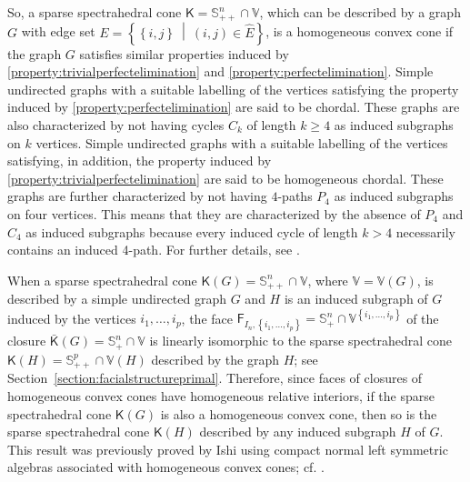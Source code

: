 \documentclass[oneside]{amsart}
\theoremstyle{plain}
\theoremstyle{definition}
\theoremstyle{remark}
\numberwithin{equation}{section}
\begin{document}
So, a sparse spectrahedral cone $\mathsf{K} = \mathbb{S}^{n}_{++} \cap
\mathbb{V}$, which can be described by a graph $G$ with edge set $E =
\left\{\left\{i, j\right\}\ \middle|\ (i, j) \in \hat{E}\right\}$, is a
homogeneous convex cone if the graph $G$ satisfies similar properties
induced by \eqref{property:trivialperfectelimination} and
\eqref{property:perfectelimination}. Simple undirected graphs with a
suitable labelling of the vertices satisfying the property induced by
\eqref{property:perfectelimination} are said to be chordal. These graphs
are also characterized by not having cycles $C_{k}$ of length $k \geq 4$ as
induced subgraphs on $k$ vertices. Simple undirected graphs with a suitable
labelling of the vertices satisfying, in addition, the property induced by
\eqref{property:trivialperfectelimination} are said to be homogeneous
chordal. These graphs are further characterized by not having $4$-paths
$P_{4}$ as induced subgraphs on four vertices. This means that they are
characterized by the absence of $P_{4}$ and $C_{4}$ as induced subgraphs
because every induced cycle of length $k > 4$ necessarily contains an
induced 4-path. For further details, see \cite[\S2 and \S3]{TunVan23}.

When a sparse spectrahedral cone $\mathsf{K}(G) = \mathbb{S}^{n}_{++} \cap
\mathbb{V}$, where $\mathbb{V} = \mathbb{V}(G)$, is described by a simple
undirected graph $G$ and $H$ is an induced subgraph of $G$ induced by the
vertices $i_{1}, \dotsc, i_{p}$, the face $\mathsf{F}_{I_{n},\left\{i_{1},
\dotsc, i_{p}\right\}} = \mathbb{S}^{n}_{+} \cap \mathbb{V}^{\left\{i_{1},
\dotsc, i_{p}\right\}}$ of the closure $\bar{\mathsf{K}}(G) =
\mathbb{S}^{n}_{+} \cap \mathbb{V}$ is linearly isomorphic to the sparse
spectrahedral cone $\mathsf{K}(H) = \mathbb{S}^{p}_{++} \cap \mathbb{V}(H)$
described by the graph $H$; see
Section~\ref{section:facialstructureprimal}. Therefore, since faces of
closures of homogeneous convex cones have homogeneous relative interiors,
if the sparse spectrahedral cone $\mathsf{K}(G)$ is also a homogeneous
convex cone, then so is the sparse spectrahedral cone $\mathsf{K}(H)$
described by any induced subgraph $H$ of $G$. This result was previously
proved by Ishi \cite[Theorem~7]{Ishi13} using compact normal left symmetric
algebras associated with homogeneous convex cones; cf.\@
\cite[Theorem~4.2]{GouItoLou25}.
\end{document}

